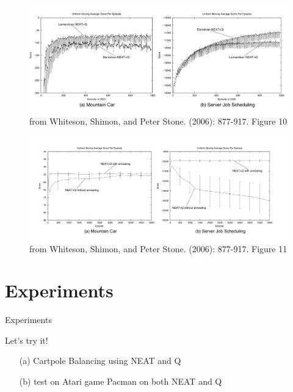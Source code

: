 \documentclass{beamer}
\begin{document}
\begin{frame}

  \begin{figure}[htbp]
    \includegraphics[width = 1.1\textwidth, left]{darwinian}
    \caption{from Whiteson, Shimon, and Peter Stone. (2006): 877-917. Figure 10}
   \end{figure}
\end{frame}

\begin{frame}

  \begin{figure}[htbp]
    \includegraphics[width = 1.1\textwidth, left]{anneal}
    \caption{from Whiteson, Shimon, and Peter Stone. (2006): 877-917. Figure 11}
   \end{figure}
\end{frame}
\section{Experiments}
\begin{frame}{Experiments}
  \begin{block}{}
    Let's try it!
  \end{block}
  \begin{block}{}
    \begin{itemize}
      \item[(a)] Cartpole Balancing using NEAT and Q
      \item[(b)] test on Atari game Pacman on both NEAT and Q
    \end{itemize}
  \end{block}
  
  \end{frame}
\end{document}
